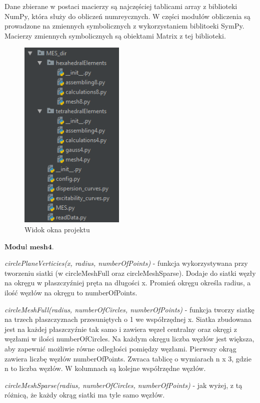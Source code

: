 Dane zbierane w postaci macierzy są najczęściej tablicami array z biblioteki NumPy, która służy do obliczeń numreycznych. W części modułów obliczenia są prowadzone na zmiennych symbolicznych z wykorzystaniem biblitoeki SymPy. Macierzy zmiennych symbolicznych są obiektami Matrix z tej biblioteki.

\begin{figure}[h]
\centering
\includegraphics[width=5cm]{Zdjecia/5/okno_projektu_MES}
\caption{Widok okna projektu}
\label{fig:okno_projektu_MES}
\end{figure}


 \( \textbf{Moduł mesh4} \).

\textit{circlePlaneVerticies(x, radius, numberOfPoints)} - funkcja wykorzystywana przy tworzeniu siatki (w circleMeshFull oraz circleMeshSparse). Dodaje do siatki węzły na okręgu w płaszczyźniej pręta na długości x. Promień okręgu określa radius, a ilość węzłów na okręgu to numberOfPoints.

\textit{circleMeshFull(radius, numberOfCircles, numberOfPoints)} - funkcja tworzy siatkę na trzech płaszczyznach przesuniętych o 1 we współrzędnej x. Siatka zbudowana jest na każdej płaszczyźnie tak samo i zawiera węzeł centralny oraz okręgi z węzłami w ilości numberOfCircles. Na każdym okręgu liczba węzłów jest większa, aby zapewnić możliwie równe odległości pomiędzy węzłami. Pierwszy okrąg zawiera liczbę węzłów numberOfPoints. Zwraca tablicę o wymiarach n x 3, gdzie n to liczba węzłów. W kolumnach są kolejne współrzędne węzłów.

\textit{circleMeshSparse(radius, numberOfCircles, numberOfPoints)} - jak wyżej, z tą różnicą, że każdy okrąg siatki ma tyle samo węzłów.

